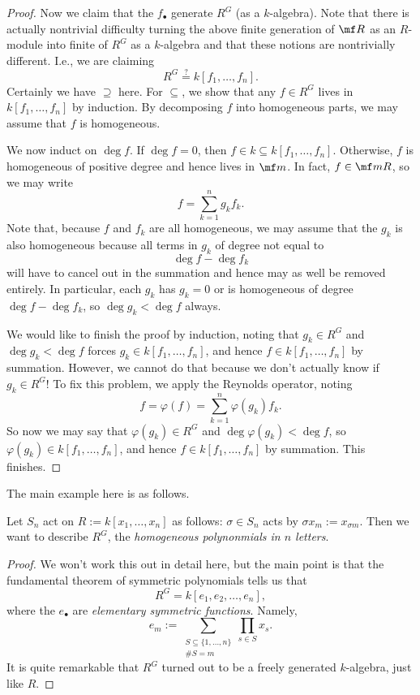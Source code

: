 \begin{proof}
	Now we claim that the $f_\bullet$ generate $R^G$ (as a $k$-algebra). Note that there is actually nontrivial difficulty turning the above finite generation of $\mf R$ as an $R$-module into finite of $R^G$ as a $k$-algebra and that these notions are nontrivially different. I.e., we are claiming
	\[R^G\stackrel?=k[f_1,\ldots,f_n].\]
	Certainly we have $\supseteq$ here. For $\subseteq$, we show that any $f\in R^G$ lives in $k[f_1,\ldots,f_n]$ by induction. By decomposing $f$ into homogeneous parts, we may assume that $f$ is homogeneous.

	We now induct on $\deg f$. If $\deg f=0$, then $f\in k\subseteq k[f_1,\ldots,f_n]$. Otherwise, $f$ is homogeneous of positive degree and hence lives in $\mf m$. In fact, $f\in\mf mR$, so we may write
	\[f=\sum_{k=1}^ng_kf_k.\]
	Note that, because $f$ and $f_k$ are all homogeneous, we may assume that the $g_k$ is also homogeneous because all terms in $g_k$ of degree not equal to
	\[\deg f-\deg f_k\]
	will have to cancel out in the summation and hence may as well be removed entirely. In particular, each $g_k$ has $g_k=0$ or is homogeneous of degree $\deg f-\deg f_k$, so $\deg g_k<\deg f$ always.

	We would like to finish the proof by induction, noting that $g_k\in R^G$ and $\deg g_k<\deg f$ forces $g_k\in k[f_1,\ldots,f_n]$, and hence $f\in k[f_1,\ldots,f_n]$ by summation. However, we cannot do that because we don't actually know if $g_k\in R^G$! To fix this problem, we apply the Reynolds operator, noting
	\[f=\varphi(f)=\sum_{k=1}^n\varphi(g_k)f_k.\]
	So now we may say that $\varphi(g_k)\in R^G$ and $\deg\varphi(g_k)<\deg f$, so $\varphi(g_k)\in k[f_1,\ldots,f_n]$, and hence $f\in k[f_1,\ldots,f_n]$ by summation. This finishes.
\end{proof}
The main example here is as follows.
\begin{exe}
	Let $S_n$ act on $R:=k[x_1,\ldots,x_n]$ as follows: $\sigma\in S_n$ acts by $\sigma x_m:=x_{\sigma m}$. Then we want to describe $R^G$, the \textit{homogeneous polynonmials in $n$ letters}.
\end{exe}
\begin{proof}
	We won't work this out in detail here, but the main point is that the fundamental theorem of symmetric polynomials tells us that
	\[R^G=k[e_1,e_2,\ldots,e_n],\]
	where the $e_\bullet$ are \textit{elementary symmetric functions}. Namely,
	\[e_m:=\sum_{\substack{S\subseteq\{1,\ldots,n\}\\\#S=m}}\prod_{s\in S}x_s.\]
	It is quite remarkable that $R^G$ turned out to be a freely generated $k$-algebra, just like $R$.
\end{proof}
